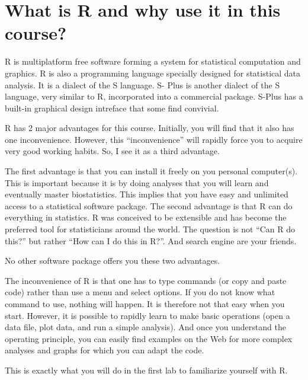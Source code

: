 \documentclass[
  12pt,
]{book}
\begin{document}
\hypertarget{what-is-r-and-why-use-it-in-this-course}{%
\section*{What is R and why use it in this course?}\label{what-is-r-and-why-use-it-in-this-course}}

R is multiplatform free software forming a system for statistical computation and graphics. R is also a programming language specially designed for statistical data analysis. It is a dialect of the S language. S- Plus is another dialect of the S language, very similar to R, incorporated into a commercial package. S-Plus has a built-in graphical design intreface that some find convivial.

R has 2 major advantages for this course. Initially, you will find that it also has one inconvenience. However, this ``inconvenience'' will rapidly force you to acquire very good working habits. So, I see it as a third advantage.

The first advantage is that you can install it freely on you personal computer(s). This is important because it is by doing analyses that you will learn and eventually master biostatistics. This implies that you have easy and unlimited access to a statistical software package. The second advantage is that R can do everything in statistics. R was conceived to be extensible and has become the preferred tool for statisticians around the world. The question is not ``Can R do this?'' but rather ``How can I do this in R?''. And search engine are your friends.

No other software package offers you these two advantages.

The inconvenience of R is that one has to type commands (or copy and paste code) rather than use a menu and select options. If you do not know what command to use, nothing will happen. It is therefore not that easy when you start. However, it is possible to rapidly learn to make basic operations (open a data file, plot data, and run a simple analysis). And once you understand the operating principle, you can easily find examples on the Web for more complex analyses and graphs for which you can adapt the code.

This is exactly what you will do in the first lab to familiarize yourself with R.
\end{document}
